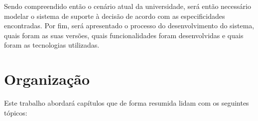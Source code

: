 
Sendo compreendido então o cenário atual da universidade, será então necessário modelar o sistema de suporte à decisão de acordo com as especificidades encontradas. Por fim, será apresentado o processo do desenvolvimento do sistema, quais foram as suas versões, quais funcionalidades foram desenvolvidas e quais foram as tecnologias utilizadas.

\section{Organização} \label{sec:Organização}            %

Este trabalho abordará capítulos que de forma resumida lidam com os seguintes tópicos:

